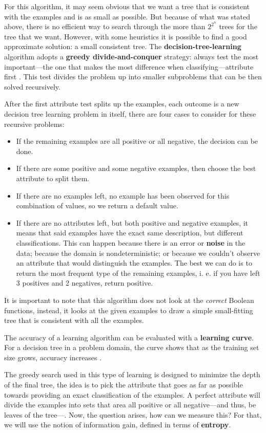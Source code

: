 \documentclass[10pt]{article}
\begin{document}
For this algorithm, it may seem obvious that we want a tree that is consistent with the examples and is as small as possible. But because of what was stated above, there is no efficient way to search through the more than $2^{2^{n}}$ trees for the tree that we want. However, with some heuristics it is possible to find a good approximate solution: a small consistent tree. The \textbf{decision-tree-learning} algorithm adopts a \textbf{greedy divide-and-conquer} strategy: always test the most important---the one that makes the most difference when classifying---attribute first \cite{ai}. This test divides the problem up into smaller subproblems that can be then solved recursively. \par
After the first attribute test splits up the examples, each outcome is a new decision tree learning problem in itself, there are four cases to consider for these recursive problems:
\begin{itemize}
    \item If the remaining examples are all positive or all negative, the decision can be done.
    \item If there are some positive and some negative examples, then choose the best attribute to split them.
    \item If there are no examples left, no example has been observed for this combination of values, so we return a default value.
    \item If there are no attributes left, but both positive and negative examples, it means that said examples have the exact same description, but different classifications. This can happen because there is an error or \textbf{noise} in the data; because the domain is nondeterministic; or because we couldn't observe an attribute that would distinguish the examples. The best we can do is to return the most frequent type of the remaining examples, i. e. if you have left 3 positives and 2 negatives, return positive.
\end{itemize}
It is important to note that this algorithm does not look at the \textit{correct} Boolean functions, instead, it looks at the given examples to draw a simple small-fitting tree that is consistent with all the examples. \par
The accuracy of a learning algorithm can be evaluated with a \textbf{learning curve}. For a decision tree in a problem domain, the curve shows that as the training set size grows, accuracy increases \cite{ai}. \par
The greedy search used in this type of learning is designed to minimize the depth of the final tree, the idea is to pick the attribute that goes as far as possible towards providing an exact classification of the examples. A perfect attribute will divide the examples into sets that area all positive or all negative---and thus, be leaves of the tree---\cite{ai}. Now, the question arises, how can we measure this? For that, we will use the notion of information gain, defined in terms of \textbf{entropy}. \par
\end{document}
